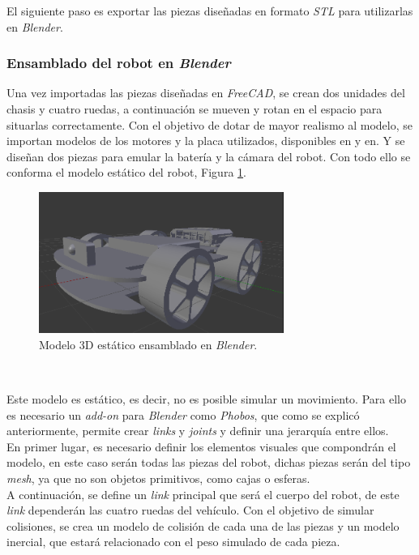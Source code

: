 El siguiente paso es exportar las piezas diseñadas en formato \textit{STL} para utilizarlas en \textit{Blender}.\\

\subsubsection{Ensamblado del robot en \textit{Blender}}

Una vez importadas las piezas diseñadas en \textit{FreeCAD}, se crean dos unidades del chasis y cuatro ruedas, a continuación se mueven y rotan en el espacio para situarlas correctamente. Con el objetivo de dotar de mayor realismo al modelo, se importan modelos de los motores y la placa utilizados, disponibles en y en. Y se diseñan dos piezas para emular la batería y la cámara del robot. Con todo ello se conforma el modelo estático del robot, Figura \ref{fig:blendermodel}.\\

\begin{figure} [h!]
	\begin{center}
		\includegraphics[width=8cm]{figs/blenderModel}
	\end{center}
	\caption{Modelo 3D estático ensamblado en \textit{Blender}.}
	\label{fig:blendermodel}
\end{figure}\

Este modelo es estático, es decir, no es posible simular un movimiento. Para ello es necesario un \textit{add-on} para \textit{Blender} como \textit{Phobos}, que como se explicó anteriormente, permite crear \textit{links} y \textit{joints} y definir una jerarquía entre ellos.\\

En primer lugar, es necesario definir los elementos visuales que compondrán el modelo, en este caso serán todas las piezas del robot, dichas piezas serán del tipo \textit{mesh}, ya que no son objetos primitivos, como cajas o esferas.\\

A continuación, se define un \textit{link} principal que será el cuerpo del robot, de este \textit{link} dependerán las cuatro ruedas del vehículo. Con el objetivo de simular colisiones, se crea un modelo de colisión de cada una de las piezas y un modelo inercial, que estará relacionado con el peso simulado de cada pieza.\\

